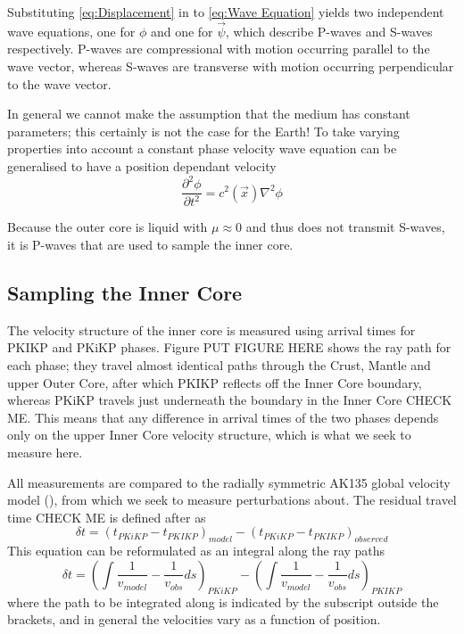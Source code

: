\documentclass[11pt,a4paper]{article}
\begin{document}
Substituting \eqref{eq:Displacement} in to \eqref{eq:Wave Equation} yields two independent wave equations, one for $\phi$ and one for $\vec{\psi}$, which describe P-waves and S-waves respectively. P-waves are compressional with motion occurring parallel to the wave vector, whereas S-waves are transverse with motion occurring perpendicular to the wave vector.

In general we cannot make the assumption that the medium has constant parameters; this certainly is not the case for the Earth! To take varying properties into account a constant phase velocity wave equation can be generalised to have a position dependant velocity
\begin{equation}
	\frac{\partial^{2} \phi}{\partial t^{2}} = c^{2} \left ( \vec{x} \right ) \nabla^{2} \phi
\end{equation}

Because the outer core is liquid with $\mu \approx 0$ and thus does not transmit S-waves, it is P-waves that are used to sample the inner core.

\subsection{Sampling the Inner Core}
The velocity structure of the inner core is measured using arrival times for PKIKP and PKiKP phases. Figure PUT FIGURE HERE shows the ray path for each phase; they travel almost identical paths through the Crust, Mantle and upper Outer Core, after which PKIKP reflects off the Inner Core boundary, whereas PKiKP travels just underneath the boundary in the Inner Core CHECK ME. This means that any difference in arrival times of the two phases depends only on the upper Inner Core velocity structure, which is what we seek to measure here.

All measurements are compared to the radially symmetric AK135 global velocity model (\cite{Kennett1995b}), from which we seek to measure perturbations about. The residual travel time CHECK ME is defined after \cite{Waszek2011a} as
\begin{equation}
	\delta t = \left ( t_{PKiKP} - t_{PKIKP} \right )_{model} -  \left ( t_{PKiKP} - t_{PKIKP} \right )_{observed}
\end{equation}
This equation can be reformulated as an integral along the ray paths
\begin{equation}
		\delta t = \left (  \int \frac{1}{v_{model}} - \frac{1}{v_{obs}} ds  \right )_{PKiKP} - \left (  \int \frac{1}{v_{model}} - \frac{1}{v_{obs}} ds  \right )_{PKIKP}
\end{equation}
where the path to be integrated along is indicated by the subscript outside the brackets, and in general the velocities vary as a function of position.
\end{document}

